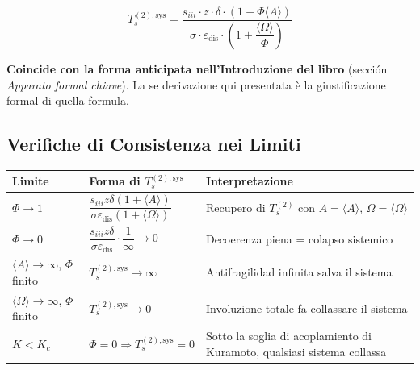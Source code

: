 \[
\boxed{T_s^{(2),\text{sys}} = \frac{s_{iii} \cdot z \cdot \delta \cdot \left(1 + \Phi \langle A \rangle\right)}{\sigma \cdot \varepsilon_{\text{dis}} \cdot \left(1 + \dfrac{\langle \Omega \rangle}{\Phi}\right)}}
\]

\Proved{} \textbf{Coincide con la forma anticipata nell'Introduzione del
libro} (sección \emph{Apparato formal chiave}). La se derivazione qui
presentata è la giustificazione formal di quella formula.

\subsection{Verifiche di Consistenza nei
Limiti}\label{verifiche-di-consistenza-nei-limiti}

{\def\LTcaptype{none} %
{\small\begin{longtable}[]{@{}
  >{\raggedright\arraybackslash}p{}
  >{\raggedright\arraybackslash}p{}
  >{\raggedright\arraybackslash}p{}@{}}
\toprule\noalign{}
\begin{minipage}[b]{\linewidth}\raggedright
Limite
\end{minipage} & \begin{minipage}[b]{\linewidth}\raggedright
Forma di \(T_s^{(2),\text{sys}}\)
\end{minipage} & \begin{minipage}[b]{\linewidth}\raggedright
Interpretazione
\end{minipage} \\
\midrule\noalign{}
\endhead
\bottomrule\noalign{}
\endlastfoot
\(\Phi \to 1\) &
\(\dfrac{s_{iii} z \delta (1+\langle A\rangle)}{\sigma \varepsilon_{\text{dis}} (1+\langle\Omega\rangle)}\)
& Recupero di \(T_s^{(2)}\) con \(A = \langle A\rangle\),
\(\Omega = \langle\Omega\rangle\) \Proved{} \\
\(\Phi \to 0\) &
\(\dfrac{s_{iii} z \delta}{\sigma \varepsilon_{\text{dis}}} \cdot \dfrac{1}{\infty} \to 0\)
& Decoerenza piena = colapso sistemico \Proved{} \\
\(\langle A\rangle \to \infty\), \(\Phi\) finito &
\(T_s^{(2),\text{sys}} \to \infty\) & Antifragilidad infinita salva il
sistema \Proved{} \\
\(\langle\Omega\rangle \to \infty\), \(\Phi\) finito &
\(T_s^{(2),\text{sys}} \to 0\) & Involuzione totale fa collassare il
sistema \Proved{} \\
\(K < K_c\) & \(\Phi = 0 \Rightarrow T_s^{(2),\text{sys}} = 0\) & Sotto
la soglia di acoplamiento di Kuramoto, qualsiasi sistema collassa
\Proved{} \\
\end{longtable}}
}

